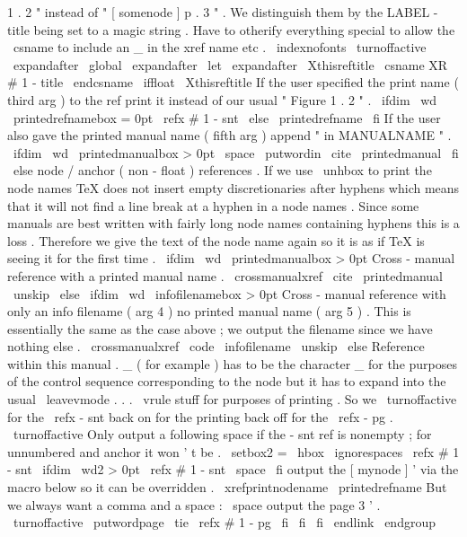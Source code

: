 {{{{{1
.
2
"
%
instead
of
"
[
somenode
]
p
.
3
"
.
We
distinguish
them
by
the
%
LABEL
-
title
being
set
to
a
magic
string
.
{
%
%
Have
to
otherify
everything
special
to
allow
the
\
csname
to
%
include
an
_
in
the
xref
name
etc
.
\
indexnofonts
\
turnoffactive
\
expandafter
\
global
\
expandafter
\
let
\
expandafter
\
Xthisreftitle
\
csname
XR
#
1
-
title
\
endcsname
}
%
\
iffloat
\
Xthisreftitle
%
If
the
user
specified
the
print
name
(
third
arg
)
to
the
ref
%
print
it
instead
of
our
usual
"
Figure
1
.
2
"
.
\
ifdim
\
wd
\
printedrefnamebox
=
0pt
\
refx
{
#
1
-
snt
}
{
}
%
\
else
\
printedrefname
\
fi
%
%
If
the
user
also
gave
the
printed
manual
name
(
fifth
arg
)
append
%
"
in
MANUALNAME
"
.
\
ifdim
\
wd
\
printedmanualbox
>
0pt
\
space
\
putwordin
{
}
\
cite
{
\
printedmanual
}
%
\
fi
\
else
%
node
/
anchor
(
non
-
float
)
references
.
%
%
If
we
use
\
unhbox
to
print
the
node
names
TeX
does
not
insert
%
empty
discretionaries
after
hyphens
which
means
that
it
will
not
%
find
a
line
break
at
a
hyphen
in
a
node
names
.
Since
some
manuals
%
are
best
written
with
fairly
long
node
names
containing
hyphens
%
this
is
a
loss
.
Therefore
we
give
the
text
of
the
node
name
%
again
so
it
is
as
if
TeX
is
seeing
it
for
the
first
time
.
%
\
ifdim
\
wd
\
printedmanualbox
>
0pt
%
Cross
-
manual
reference
with
a
printed
manual
name
.
%
\
crossmanualxref
{
\
cite
{
\
printedmanual
\
unskip
}
}
%
%
\
else
\
ifdim
\
wd
\
infofilenamebox
>
0pt
%
Cross
-
manual
reference
with
only
an
info
filename
(
arg
4
)
no
%
printed
manual
name
(
arg
5
)
.
This
is
essentially
the
same
as
%
the
case
above
;
we
output
the
filename
since
we
have
nothing
else
.
%
\
crossmanualxref
{
\
code
{
\
infofilename
\
unskip
}
}
%
%
\
else
%
Reference
within
this
manual
.
%
%
_
(
for
example
)
has
to
be
the
character
_
for
the
purposes
of
the
%
control
sequence
corresponding
to
the
node
but
it
has
to
expand
%
into
the
usual
\
leavevmode
.
.
.
\
vrule
stuff
for
purposes
of
%
printing
.
So
we
\
turnoffactive
for
the
\
refx
-
snt
back
on
for
the
%
printing
back
off
for
the
\
refx
-
pg
.
{
\
turnoffactive
%
Only
output
a
following
space
if
the
-
snt
ref
is
nonempty
;
for
%
unnumbered
and
anchor
it
won
'
t
be
.
\
setbox2
=
\
hbox
{
\
ignorespaces
\
refx
{
#
1
-
snt
}
{
}
}
%
\
ifdim
\
wd2
>
0pt
\
refx
{
#
1
-
snt
}
\
space
\
fi
}
%
%
output
the
[
mynode
]
'
via
the
macro
below
so
it
can
be
overridden
.
\
xrefprintnodename
\
printedrefname
%
%
But
we
always
want
a
comma
and
a
space
:
\
space
%
%
output
the
page
3
'
.
\
turnoffactive
\
putwordpage
\
tie
\
refx
{
#
1
-
pg
}
{
}
%
\
fi
\
fi
\
fi
\
endlink
\
endgroup
}}}}}

